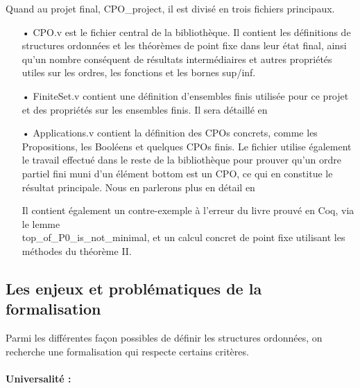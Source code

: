 \documentclass{article}
\newcommand\code[1]{{\fontfamily{lmtt}\selectfont #1}}
\theoremstyle{definition}
\begin{document}
Quand au projet final, \code{CPO\_project}, il est divisé en trois fichiers principaux.

\medskip


\begin{itemize}
\item[•] \code{CPO.v} est le fichier central de la bibliothèque. Il contient les définitions de structures ordonnées et les théorèmes de point fixe dans leur état final, ainsi qu'un nombre conséquent de résultats intermédiaires et autres propriétés utiles sur les ordres, les fonctions et les bornes sup/inf. %
\item[•] \code{FiniteSet.v} contient une définition d'ensembles finis utilisée pour ce projet et des propriétés sur les ensembles finis. Il sera détaillé en %
\item[•] \code{Applications.v} contient la définition des CPOs concrets, comme les Propositions, les Booléens et quelques CPOs finis. Le fichier utilise également le travail effectué dans le reste de la bibliothèque pour prouver qu'un ordre partiel fini muni d'un élément bottom est un CPO, ce qui en constitue le résultat principale. Nous en parlerons plus en détail en %

Il contient également un contre-exemple à l'erreur du livre prouvé en Coq, via le lemme \\ \code{top\_of\_P0\_is\_not\_minimal}, et un calcul concret de point fixe utilisant les méthodes du théorème II.
\end{itemize}




\subsection{Les enjeux et problématiques de la formalisation}

Parmi les différentes façon possibles de définir les structures ordonnées, on recherche une formalisation qui respecte certains critères.

\paragraph{Universalité :\\}
\end{document}
